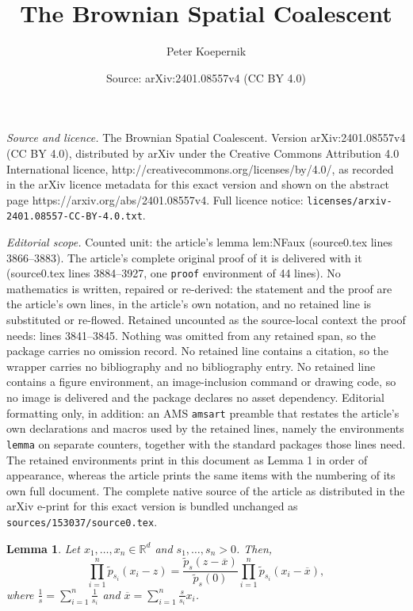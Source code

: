 \documentclass[10pt,a4paper]{amsart}
\title{The Brownian Spatial Coalescent}
\author{Peter Koepernik}
\date{Source: arXiv:2401.08557v4 (CC BY 4.0)}
\newtheorem{lemma}{Lemma}
\newcommand{\R}{\mathbb{R}} %
\newcommand{\interp}{\overline{x}} %
\newcommand{\rfy}[1]{\widetilde{{#1}}} %
\begin{document}
\maketitle

\noindent\emph{Source and licence.} The Brownian Spatial Coalescent. Version arXiv:2401.08557v4 (CC BY 4.0), distributed by arXiv under the Creative Commons Attribution 4.0 International licence, http://creativecommons.org/licenses/by/4.0/, as recorded in the arXiv licence metadata for this exact version and shown on the abstract page https://arxiv.org/abs/2401.08557v4. Full licence notice: \texttt{licenses/arxiv-2401.08557-CC-BY-4.0.txt}.\par\smallskip

\noindent\textit{Editorial scope.} Counted unit: the article's lemma lem:NFaux (source0.tex lines 3866--3883). The article's complete original proof of it is delivered with it (source0.tex lines 3884--3927, one \texttt{proof} environment of 44 lines). No mathematics is written, repaired or re-derived: the statement and the proof are the article's own lines, in the article's own notation, and no retained line is substituted or re-flowed.  Retained uncounted as the source-local context the proof needs: lines 3841--3845.  Nothing was omitted from any retained span, so the package carries no omission record.  No retained line contains a citation, so the wrapper carries no bibliography and no bibliography entry.  No retained line contains a figure environment, an image-inclusion command or drawing code, so no image is delivered and the package declares no asset dependency.  Editorial formatting only, in addition: an AMS \texttt{amsart} preamble that restates the article's own declarations and macros used by the retained lines, namely the environments \texttt{lemma} on separate counters, together with the standard packages those lines need.  The retained environments print in this document as Lemma 1 in order of appearance, whereas the article prints the same items with the numbering of its own full document.  The complete native source of the article as distributed in the arXiv e-print for this exact version is bundled unchanged as \texttt{sources/153037/source0.tex}.
\begin{lemma}\label{lem:heatkerneltrick}
    Let $x_1, \ldots ,x_n \in \R^d$ and $s_1, \ldots ,s_n > 0$. Then, \[
        \prod_{i=1}^n \rfy{p}_{s_i}(x_i-z) = \frac{\rfy{p}_s(z-\overline{x})}{\rfy{p}_s(0)} \prod_{i=1}^n \rfy{p}_{s_i}(x_i - \interp),
    \] where $\frac{1}{s} = \sum_{i=1}^n \frac{1}{s_i}$ and $\interp = \sum_{i=1}^n \frac{s}{s_i}x_i$.
\end{lemma}
\end{document}
